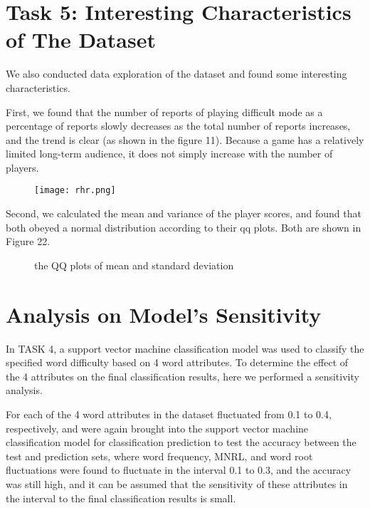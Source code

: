 \documentclass[12pt]{article}  %
\begin{document}
\section{Task 5: Interesting Characteristics of The Dataset}
We also conducted data exploration of the dataset and found some interesting characteristics.

First, we found that the number of reports of playing difficult mode as a percentage of reports slowly decreases as the total number of reports increases, and the trend is clear (as shown in the figure 11). Because a game has a relatively limited long-term audience, it does not simply increase with the number of players.
\begin{figure}[H]
	\centering
	\texttt{[image: rhr.png]}
	\caption{}
	\label{img11}
\end{figure}

Second, we calculated the mean and variance of the player scores, and found that both obeyed a normal distribution according to their qq plots. Both are shown in Figure 22.
\begin{figure}[H]
	\centering    
	\caption{the QQ plots of mean and standard deviation}		%
	\label{}									%
\end{figure}



	
	\section{Analysis on Model's Sensitivity}

	In TASK 4, a support vector machine classification model was used to classify the specified word difficulty based on 4 word attributes. To determine the effect of the 4 attributes on the final classification results, here we performed a sensitivity analysis.
	
	For each of the 4 word attributes in the dataset fluctuated from 0.1 to 0.4, respectively, and were again brought into the support vector machine classification model for classification prediction to test the accuracy between the test and prediction sets, where word frequency, MNRL, and word root fluctuations were found to fluctuate in the interval 0.1 to 0.3, and the accuracy was still high, and it can be assumed that the sensitivity of these attributes in the interval to the final classification results is small.
	
\end{document}
